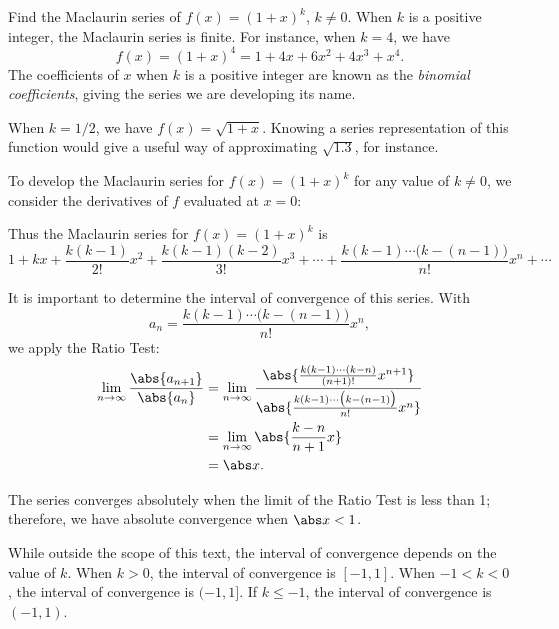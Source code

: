 \begin{example}\label{ex_ts4}
Find the Maclaurin series of $f(x) = (1+x)^k$, $k\neq 0$.
\solution
When $k$ is a positive integer, the Maclaurin series is finite. For instance, when $k=4$, we have 
\[f(x) = (1+x)^4 = 1+4x+6x^2+4x^3+x^4.\]
The coefficients of $x$ when $k$ is a positive integer are known as the \emph{binomial coefficients}, giving the series we are developing its name.

When $k=1/2$, we have $f(x) = \sqrt{1+x}$. Knowing a series representation of this function would give a useful way of approximating $\sqrt{1.3}$, for instance.

To develop the Maclaurin series for $f(x) = (1+x)^k$ for any value of $k\neq0$, we consider the derivatives of $f$ evaluated at $x=0$:


Thus the Maclaurin series for $f(x) = (1+x)^k$ is
\[
1+ kx + \frac{k(k-1)}{2!}x^2 + \frac{k(k-1)(k-2)}{3!}x^3 + \dotsb + \frac{k(k-1)\dotsm\bigl(k-(n-1)\bigr)}{n!}x^n+\dotsb
\]

It is important to determine the interval of convergence of this series. With 
\[a_n = \frac{k(k-1)\dotsm\bigl(k-(n-1)\bigr)}{n!}x^n,\]
we apply the Ratio Test:
\begin{align*}
	\lim_{n\to\infty}\frac{\abs{a_{n+1}}}{\abs{a_n}}
	&=\lim_{n\to\infty}\frac{\abs{\frac{k(k-1)\dotsm(k-n)}{(n+1)!}x^{n+1}}}{\abs{\frac{k(k-1)\dotsm\bigl(k-(n-1)\bigr)}{n!}x^n}}\\
		&=\lim_{n\to\infty} \abs{\frac{k-n}{n+1}x}\\
		&= \abs x.
\end{align*}

The series converges absolutely when the limit of the Ratio Test is less than 1; therefore, we have absolute convergence when $\abs x<1$. 

While outside the scope of this text, the interval of convergence depends on the value of $k$. When $k>0$, the interval of convergence is $[-1,1]$. When $-1<k<0$, the interval of convergence is $(-1,1]$. If $k\leq -1$, the interval of convergence is $(-1,1)$.
\end{example}

